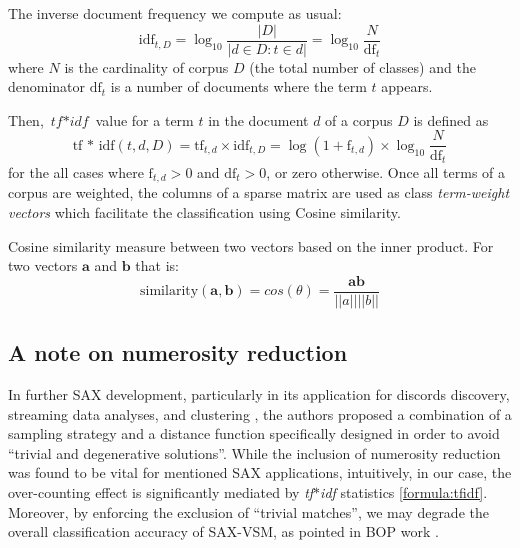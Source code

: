 \documentclass{llncs}
\begin{document}
The inverse document frequency we compute as usual:
\begin{equation}
 \mbox{idf}_{t, D} =  \log_{10}\frac{|D|}{|d \in D : t \in d|} = \log_{10}\frac{N}{\mbox{df}_{t}}
\end{equation} 
where $N$ is the cardinality of corpus $D$ (the total number of classes) and the 
denominator $\mbox{df}_{t}$ is a number of documents where the term $t$ appears.

Then, $\textit{tf$\ast$idf}$ value for a term $t$ in the document $d$ of a corpus $D$ is defined as 
\begin{equation}
 \mbox{tf * idf}(t, d, D) =  \mbox{tf}_{t, d} \times \mbox{idf}_{t, D} = \log(1 + \mbox{f}_{t,d})
\times \log_{10}\frac{N}{\mbox{df}_{t}}
 \label{formula:tfidf}
\end{equation} 
for the all cases where $\mbox{f}_{t,d}>0$ and $\mbox{df}_{t}>0$, or zero otherwise.
Once all terms of a corpus are weighted, the columns of a sparse matrix are used 
as class \textit{term-weight vectors} which facilitate the classification using Cosine similarity. 

Cosine similarity measure between two vectors based on the inner product. 
For two vectors $\boldsymbol{a}$ and $\boldsymbol{b}$ that is:
\begin{equation}
\mbox{similarity}(\boldsymbol{a},\boldsymbol{b}) = cos(\theta) = \frac{ 
\mathbf{a} \mathbf{b} } {\left| \left| a \right| \right| \left| \left| b \right| \right|}
\end{equation} 

\subsection{A note on numerosity reduction}
In further SAX development, particularly in its application for discords discovery,
streaming data analyses, and clustering \cite{hot_sax} \cite{streaming_sax}, the authors 
proposed a combination of a sampling strategy and a distance function specifically 
designed in order to avoid ``trivial and degenerative solutions''. While the inclusion of
numerosity reduction was found to be vital for mentioned SAX applications, intuitively, 
in our case, the over-counting effect is significantly mediated by \textit{tf$\ast$idf}
statistics \eqref{formula:tfidf}. Moreover, by enforcing the exclusion of ``trivial matches'', we
may degrade the overall classification accuracy of SAX-VSM, as pointed in 
BOP work \cite{bag_patterns}.
\end{document}
